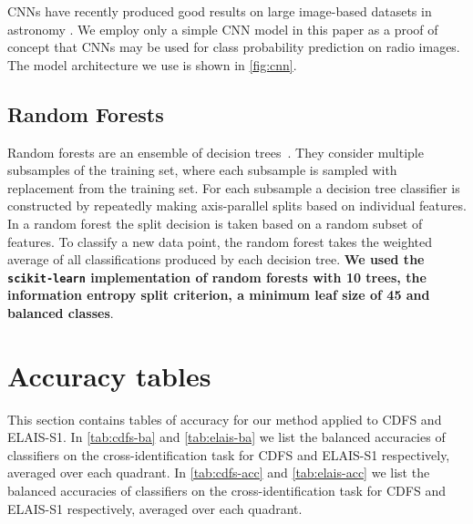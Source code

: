 \documentclass[fleqn,usenatbib,usedcolumn]{mnras}
\newcommand{\edited}[1]{{\bf {#1}}}
\begin{document}
    CNNs have recently produced good results on large image-based datasets in
    astronomy \citep[e.g.][; Lukic et al. in prep]{dieleman15cnn}. We employ
    only a simple CNN model in this paper as a proof of concept that CNNs may
    be used for class probability prediction on radio images. The model
    architecture we use is shown in \autoref{fig:cnn}.

  \subsection{Random Forests}
  \label{sec:random-forests}

    Random forests are an ensemble of decision
    trees~\citep{breiman01random-forest}. They consider multiple subsamples of
    the training set, where each subsample is sampled with replacement from
    the training set. For each subsample a decision tree classifier is
    constructed by repeatedly making axis-parallel splits based on individual
    features. In a random forest the split decision is taken based on a random
    subset of features. To classify a new data point, the random forest takes
    the weighted average of all classifications produced by each decision
    tree. \edited{We used the \texttt{scikit-learn} \citep{pedregosa11sklearn}
    implementation of random forests with 10 trees, the information entropy
    split criterion, a minimum leaf size of 45 and balanced classes}.

\section{Accuracy tables}\label{app:accuracies}
  
  This section contains tables of accuracy for our method applied to CDFS and
  ELAIS-S1. In \autoref{tab:cdfs-ba} and \autoref{tab:elais-ba} we list the
  balanced accuracies of classifiers on the cross-identification task for CDFS
  and ELAIS-S1 respectively, averaged over each quadrant. In
  \autoref{tab:cdfs-acc} and \autoref{tab:elais-acc} we list the balanced
  accuracies of classifiers on the cross-identification task for CDFS and
  ELAIS-S1 respectively, averaged over each quadrant.
\end{document}
